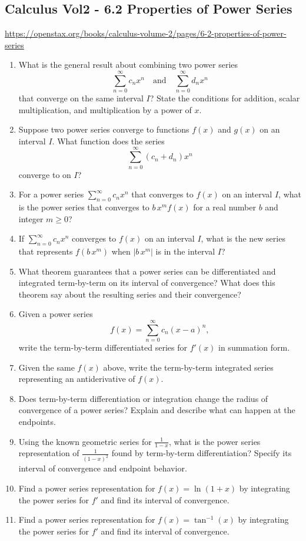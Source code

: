 \subsection{Calculus Vol2 - 6.2 Properties of Power Series}

\url{https://openstax.org/books/calculus-volume-2/pages/6-2-properties-of-power-series}

\begin{enumerate}
  \item What is the general result about combining two power series
    \[ \sum_{n=0}^{\infty}c_{n}x^{n}\quad\text{and}\quad\sum_{n=0}^{\infty}d_{n}x^{n} \]
    that converge on the same interval \(I\)? State the conditions for addition, scalar multiplication, and multiplication by a power of \(x\).
  \item Suppose two power series converge to functions \(f(x)\) and \(g(x)\) on an interval \(I\). What function does the series
    \[ \sum_{n=0}^{\infty}(c_{n}+d_{n})x^{n} \]
    converge to on \(I\)?
  \item For a power series \(\sum_{n=0}^{\infty}c_{n}x^{n}\) that converges to \(f(x)\) on an interval \(I\), what is the power series that converges to \(b\,x^{m} f(x)\) for a real number \(b\) and integer \(m\ge0\)?
  \item If \(\sum_{n=0}^{\infty}c_{n}x^{n}\) converges to \(f(x)\) on an interval \(I\), what is the new series that represents \(f(b\,x^{m})\) when \(|b\,x^{m}|\) is in the interval \(I\)?
  \item What theorem guarantees that a power series can be differentiated and integrated term-by-term on its interval of convergence? What does this theorem say about the resulting series and their convergence?
  \item Given a power series
    \[ f(x)=\sum_{n=0}^{\infty}c_{n}(x-a)^{n}, \]
    write the term-by-term differentiated series for \(f'(x)\) in summation form.
  \item Given the same \(f(x)\) above, write the term-by-term integrated series representing an antiderivative of \(f(x)\).
  \item Does term-by-term differentiation or integration change the radius of convergence of a power series? Explain and describe what can happen at the endpoints.
  \item Using the known geometric series for \(\frac{1}{1-x}\), what is the power series representation of \(\frac{1}{(1-x)^{2}}\) found by term-by-term differentiation? Specify its interval of convergence and endpoint behavior.
  \item Find a power series representation for \(f(x)=\ln(1+x)\) by integrating the power series for \(f'\) and find its interval of convergence.
  \item Find a power series representation for \(f(x)=\tan^{-1}(x)\) by integrating the power series for \(f'\) and find its interval of convergence.
\end{enumerate}
